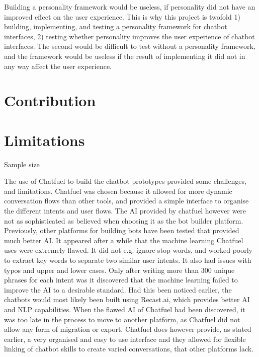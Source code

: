 Building a personality framework would be useless, if personality did not have an improved effect on the user experience. This is why this project is twofold 1) building, implementing, and testing a personality framework for chatbot interfaces, 2) testing whether personality improves the user experience of chatbot interfaces. The second would be difficult to test without a personality framework, and the framework would be useless if the result of implementing it did not in any way affect the user experience.

\section{Contribution}

\section{Limitations}
Sample size

The use of Chatfuel to build the chatbot prototypes provided some challenges, and limitations. Chatfuel was chosen because it allowed for more dynamic conversation flows than other tools, and provided a simple interface to organise the different intents and user flows. The AI provided by chatfuel however were not as sophisticated as believed when choosing it as the bot builder platform. Previously, other platforms for building bots have been tested that provided much better AI. It appeared after a while that the machine learning Chatfuel uses were extremely flawed. It did not e.g. ignore stop words, and worked poorly to extract key words to separate two similar user intents. It also had issues with typos and upper and lower cases. Only after writing more than 300 unique phrases for each intent was it discovered that the machine learning failed to improve the AI to a desirable standard. Had this been noticed earlier, the chatbots would most likely been built using Recast.ai, which provides better AI and NLP capabilities. When the flawed AI of Chatfuel had been discovered, it was too late in the process to move to another platform, as Chatfuel did not allow any form of migration or export. Chatfuel does however provide, as stated earlier, a very organised and easy to use interface and they allowed for flexible linking of chatbot skills to create varied conversations, that other platforms lack. 